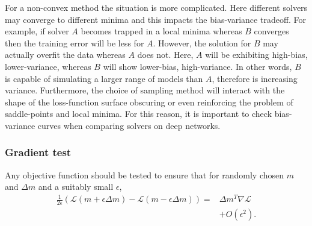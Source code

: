 \documentclass[nohyperref]{article}
\theoremstyle{plain}
\theoremstyle{definition}
\theoremstyle{remark}
\begin{document}
For a non-convex method the situation is more complicated. Here different solvers may converge to different minima and this impacts the bias-variance tradeoff. For example, if solver $A$ becomes trapped in a local minima whereas $B$ converges then the training error will be less for $A$. However, the solution for $B$ may actually overfit the data whereas $A$ does not. Here, $A$ will be exhibiting high-bias, lower-variance, whereas $B$ will show lower-bias, high-variance. In other words, $B$ is capable of simulating a larger range of models than $A$, therefore is increasing variance. Furthermore, the choice of sampling method will interact with the shape of the loss-function surface obscuring or even reinforcing the problem of saddle-points and local minima. For this reason, it is important to check bias-variance curves when comparing solvers on deep networks.
 
\subsubsection*{Gradient test}\label{grad_test}
Any objective function should be tested to ensure that for randomly chosen $m$ and $\Delta m$ and a suitably small $\epsilon$,
\begin{align}
\frac{1}{2 \epsilon}(\mathcal{L}(m+\epsilon \Delta m)-\mathcal{L}(m-\epsilon \Delta m))=&\Delta m^T \nabla \mathcal{L}\nonumber\\
 &+ O(\epsilon^2). 
\end{align}
 
\end{document}
